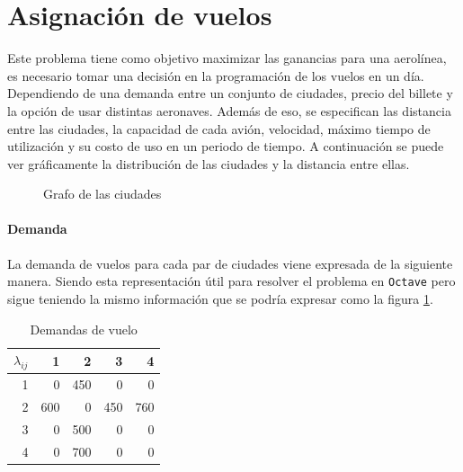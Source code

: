 \documentclass[12pt]{article}
\begin{document}
\section{Asignación de vuelos}

Este problema tiene como objetivo maximizar las ganancias para una aerolínea, es necesario tomar una decisión en la programación de los vuelos en un día. Dependiendo de una demanda entre un conjunto de ciudades, precio del billete y la opción de usar distintas aeronaves. Además de eso, se especifican las distancia entre las ciudades, la capacidad de cada avión, velocidad, máximo tiempo de utilización y su costo de uso en un periodo de tiempo. A continuación se puede ver gráficamente la distribución de las ciudades y la distancia entre ellas.

\vspace{1em}

\begin{figure}[h]
    \centering
    \caption{Grafo de las ciudades}
    \label{fig:cities}
\end{figure}

\paragraph{Demanda}

La demanda de vuelos para cada par de ciudades viene expresada de la siguiente manera. Siendo esta representación útil para resolver el problema en \texttt{Octave} pero sigue teniendo la mismo información que se podría expresar como la figura \ref{fig:cities}.

\begin{table}[h!]
    \centering
    \begin{tabular}{r|r|r|r|r}
        $\lambda_{ij}$%
               &   1  &   2  &   3  &   4\\
            \hline
            \hline
            1  &   0  & 450  &   0  &   0\\
            2  & 600  &   0  & 450  & 760\\
            3  &   0  & 500  &   0  &   0\\
            4  &   0  & 700  &   0  &   0\\
    \end{tabular}
    \caption{Demandas de vuelo}
    \label{tab:demand}
\end{table}
\end{document}
